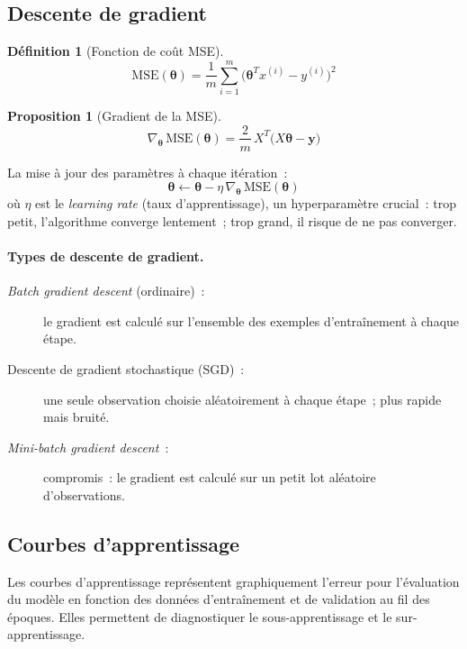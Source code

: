\documentclass[a4paper,12pt,twoside]{report}
\theoremstyle{definition}
\newtheorem{defi}{Définition}
\newtheorem{prop}{Proposition}
\theoremstyle{plain}
\theoremstyle{remark}
\newcommand{\rv}[1]{\boldsymbol{#1}}
\begin{document}
\subsection{Descente de gradient}
\label{subsec:gradient}

\begin{defi}[Fonction de coût \acs{MSE}]
\[
\text{MSE}(\rv{\theta}) = \frac{1}{m}
\sum_{i=1}^{m}\bigl(\rv{\theta}^T x^{(i)} - y^{(i)}\bigr)^2
\]
\end{defi}

\begin{prop}[Gradient de la \acs{MSE}]
\[
\nabla_{\rv{\theta}}\,\text{MSE}(\rv{\theta}) =
\frac{2}{m}\,X^T\!\bigl(X\rv{\theta} - \rv{y}\bigr)
\]
\end{prop}

La mise à jour des paramètres à chaque itération~:
\[
\rv{\theta} \leftarrow \rv{\theta} - \eta\,\nabla_{\rv{\theta}}\,\text{MSE}(\rv{\theta})
\]
où $\eta$ est le \textit{learning rate} (taux d'apprentissage), un hyperparamètre crucial~:
trop petit, l'algorithme converge lentement~; trop grand, il risque de ne pas converger.

\paragraph{Types de descente de gradient.}
\begin{description}
	\item[\textit{Batch gradient descent} (ordinaire)~:] le gradient est calculé sur
	      l'ensemble des exemples d'entraînement à chaque étape.
	\item[Descente de gradient stochastique (\acs{SGD})~:] une seule observation choisie
	      aléatoirement à chaque étape~; plus rapide mais bruité.
	\item[\textit{Mini-batch gradient descent}~:] compromis~: le gradient est calculé sur
	      un petit lot aléatoire d'observations.
\end{description}

\subsection{Courbes d'apprentissage}

Les courbes d'apprentissage représentent graphiquement l'erreur pour l'évaluation du modèle
en fonction des données d'entraînement et de validation au fil des époques. Elles permettent
de diagnostiquer le sous-apprentissage et le sur-apprentissage.
\end{document}
